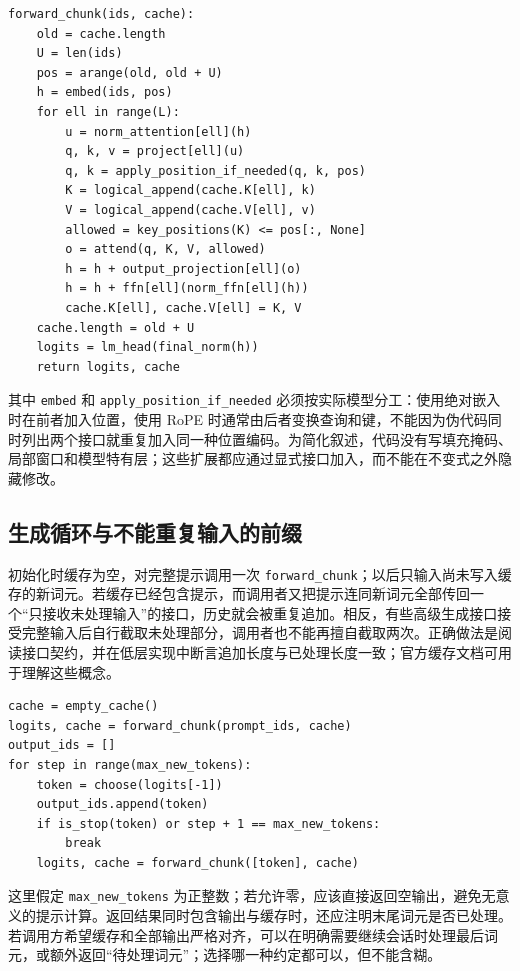 \documentclass[UTF8,12pt,a4paper,fontset=fandol]{ctexart}
\begin{document}
\begin{verbatim}
forward_chunk(ids, cache):
    old = cache.length
    U = len(ids)
    pos = arange(old, old + U)
    h = embed(ids, pos)
    for ell in range(L):
        u = norm_attention[ell](h)
        q, k, v = project[ell](u)
        q, k = apply_position_if_needed(q, k, pos)
        K = logical_append(cache.K[ell], k)
        V = logical_append(cache.V[ell], v)
        allowed = key_positions(K) <= pos[:, None]
        o = attend(q, K, V, allowed)
        h = h + output_projection[ell](o)
        h = h + ffn[ell](norm_ffn[ell](h))
        cache.K[ell], cache.V[ell] = K, V
    cache.length = old + U
    logits = lm_head(final_norm(h))
    return logits, cache
\end{verbatim}

其中 \texttt{embed} 和 \texttt{apply\_position\_if\_needed} 必须按实际模型分工：使用绝对嵌入时在前者加入位置，使用 RoPE 时通常由后者变换查询和键，不能因为伪代码同时列出两个接口就重复加入同一种位置编码。为简化叙述，代码没有写填充掩码、局部窗口和模型特有层；这些扩展都应通过显式接口加入，而不能在不变式之外隐藏修改。

\subsection{生成循环与不能重复输入的前缀}

初始化时缓存为空，对完整提示调用一次 \texttt{forward\_chunk}；以后只输入尚未写入缓存的新词元。若缓存已经包含提示，而调用者又把提示连同新词元全部传回一个“只接收未处理输入”的接口，历史就会被重复追加。相反，有些高级生成接口接受完整输入后自行截取未处理部分，调用者也不能再擅自截取两次。正确做法是阅读接口契约，并在低层实现中断言追加长度与已处理长度一致；官方缓存文档可用于理解这些概念\cite{hf-cache}。

\begin{verbatim}
cache = empty_cache()
logits, cache = forward_chunk(prompt_ids, cache)
output_ids = []
for step in range(max_new_tokens):
    token = choose(logits[-1])
    output_ids.append(token)
    if is_stop(token) or step + 1 == max_new_tokens:
        break
    logits, cache = forward_chunk([token], cache)
\end{verbatim}

这里假定 \texttt{max\_new\_tokens} 为正整数；若允许零，应该直接返回空输出，避免无意义的提示计算。返回结果同时包含输出与缓存时，还应注明末尾词元是否已处理。若调用方希望缓存和全部输出严格对齐，可以在明确需要继续会话时处理最后词元，或额外返回“待处理词元”；选择哪一种约定都可以，但不能含糊。
\end{document}
